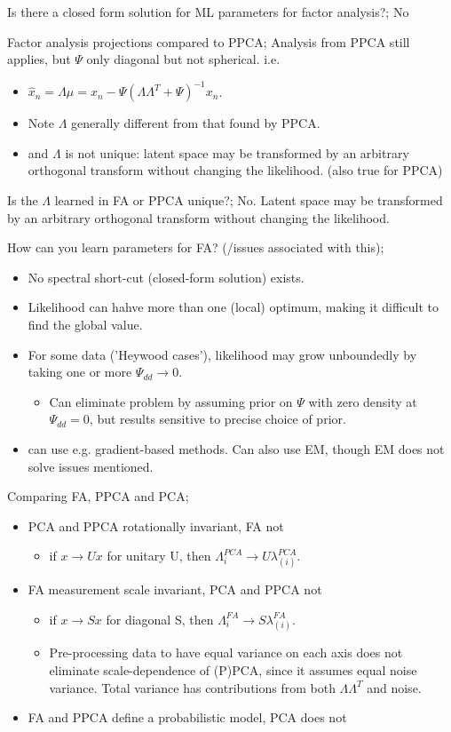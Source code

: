 \documentclass{article}
\begin{document}
Is there a closed form solution for ML parameters for factor analysis?; No

Factor analysis projections compared to PPCA; Analysis from PPCA still applies, but $\Psi$ only diagonal but not spherical. i.e. \begin{itemize}
	\item $\hat{x}_n=\Lambda\mu=x_n - \Psi(\Lambda\Lambda^T+\Psi)^{-1}x_n$.
	\item Note $\Lambda$ generally different from that found by PPCA.
	\item and $\Lambda$ is not unique: latent space may be transformed by an arbitrary orthogonal transform without changing the likelihood. (also true for PPCA)
\end{itemize}

Is the $\Lambda$ learned in FA or PPCA unique?; No. Latent space may be transformed by an arbitrary orthogonal transform without changing the likelihood.

How can you learn parameters for FA? (/issues associated with this); \begin{itemize}
	\item No spectral short-cut (closed-form solution) exists.
	\item Likelihood can hahve more than one (local) optimum, making it difficult to find the global value.
	\item For some data ('Heywood cases'), likelihood may grow unboundedly by taking one or more $\Psi_{dd}\rightarrow 0$.
	\begin{itemize}
		\item Can eliminate problem by assuming prior on $\Psi$ with zero density at $\Psi_{dd}=0$, but results sensitive to precise choice of prior.
	\end{itemize}
	\item can use e.g. gradient-based methods. Can also use EM, though EM does not solve issues mentioned.
\end{itemize}

Comparing FA, PPCA and PCA; \begin{itemize}
	\item PCA and PPCA rotationally invariant, FA not
	\begin{itemize}
		\item if $x\rightarrow Ux$ for unitary U, then $\Lambda^{PCA}_{i}\rightarrow U \lambda^{PCA}_{(i)}$.
	\end{itemize}
	\item FA measurement scale invariant, PCA and PPCA not
		\begin{itemize}
		\item if $x\rightarrow Sx$ for diagonal S, then $\Lambda^{FA}_{i}\rightarrow S \lambda^{FA}_{(i)}$.
		\item Pre-processing data to have equal variance on each axis does not eliminate scale-dependence of (P)PCA, since it assumes equal noise variance. Total variance has contributions from both $\Lambda\Lambda^T$ and noise.
	\end{itemize}
	\item FA and PPCA define a probabilistic model, PCA does not
\end{itemize}
\end{document}
